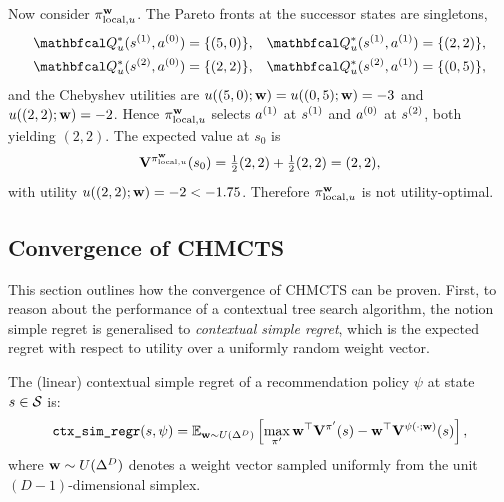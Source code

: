 \begin{proofoutline}
        Now consider $\pi^{\mathbf{w}}_{\text{local},u}$. The Pareto fronts at the successor 
        states are singletons,
        \begin{align*}
            \bfcl{Q}^*_u(\sss{1}, \aaa{0}) &= \{(5, 0)\}, &
            \bfcl{Q}^*_u(\sss{1}, \aaa{1}) &= \{(2, 2)\}, \\
            \bfcl{Q}^*_u(\sss{2}, \aaa{0}) &= \{(2, 2)\}, &
            \bfcl{Q}^*_u(\sss{2}, \aaa{1}) &= \{(0, 5)\},
        \end{align*}
        and the Chebyshev utilities are $u((5, 0); \mathbf{w}) = u((0, 5); \mathbf{w}) = -3$ 
        and $u((2, 2); \mathbf{w}) = -2$. Hence $\pi^{\mathbf{w}}_{\text{local},u}$ selects $a^{(1)}$ at 
        $s^{(1)}$ and $a^{(0)}$ at $s^{(2)}$, both yielding $(2, 2)$. The expected value at $s_0$ is
        \begin{equation*}
            \mathbf{V}^{\pi^{\mathbf{w}}_{\text{local},u}}(s_0) 
            = \tfrac{1}{2}(2, 2) + \tfrac{1}{2}(2, 2) = (2, 2),
        \end{equation*}
        with utility $u((2, 2); \mathbf{w}) = -2 < -1.75$. Therefore 
        $\pi^{\mathbf{w}}_{\text{local},u}$ is not utility-optimal.
    \end{proofoutline}













\subsection{Convergence of CHMCTS}
\label{sec:5-6-4-convergence_of_chmcts}

    This section outlines how the convergence of CHMCTS can be proven. First, to reason about the performance of a contextual tree search algorithm, the notion simple regret is generalised to \textit{contextual simple regret}, which is the expected regret with respect to utility over a uniformly random weight vector.
    
    \begin{defn}
        \label{def:5:contextual_simple_regret}
        The \textnormal{(linear) contextual simple regret} of a recommendation policy $\psi$ at state $s\in\mathcal{S}$ is:
        \begin{align}
            {\textnormal{\texttt{ctx\_sim\_regr}}}(s,\psi) = \mathbb{E}_{\mathbf{w}\sim U(\Delta^D)}\left[
                \max_{\pi'} {\mathbf{w}}^\top \mathbf{V}^{\pi'}(s) 
                - {\mathbf{w}}^\top \mathbf{V}^{\psi(\cdot;\mathbf{w})}(s)
            \right],
        \end{align}
        where $\mathbf{w}\sim U(\Delta^D)$ denotes a weight vector sampled uniformly from the unit $(D-1)$-dimensional simplex.
    \end{defn}
    
